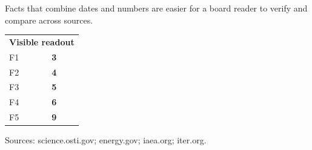 \documentclass[10pt,a4paper]{article}
\begin{document}
\vspace{1pt}\noindent\begin{minipage}[t]{0.56\linewidth}
{\footnotesize\color{BOText} Facts that combine dates and numbers are easier for a board reader to verify and compare across sources.}\par
\end{minipage}\hfill\begin{minipage}[t]{0.36\linewidth}
{\scriptsize\color{BOText}\begin{tabular}{p{31mm}>{\raggedleft\arraybackslash}p{18mm}}
\multicolumn{2}{l}{\textcolor{BOGreen}{\bfseries Visible readout}}\\[2pt]
F1 & \textbf{3}\\[1pt]
F2 & \textbf{4}\\[1pt]
F3 & \textbf{5}\\[1pt]
F4 & \textbf{6}\\[1pt]
F5 & \textbf{9}\\[1pt]
\end{tabular}}\par
\end{minipage}\par\vspace{1pt}
\par
{\scriptsize\color{BOMuted} Sources: science.osti.gov; energy.gov; iaea.org; iter.org.}\par
\end{document}
